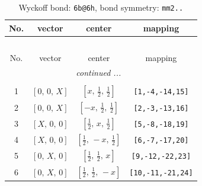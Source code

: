 \documentclass[fleqn,8pt]{jsarticle}
\begin{document}
\renewcommand{\arraystretch}{1.2}
\begin{longtable}{cccc}
\caption{Wyckoff bond: {\tt 6b@6h}, bond symmetry: {\tt mm2..}}
 \\
 \hline \hline
No. & vector & center & mapping \\ \hline \endfirsthead

\multicolumn{3}{l}{\tablename\ \thetable{}} \\
 \hline \hline
No. & vector & center & mapping \\ \hline \endhead

 \hline \hline
\multicolumn{3}{r}{\footnotesize\it continued ...} \\ \endfoot

 \hline \hline
\multicolumn{3}{r}{} \\ \endlastfoot

1 & $\left[ 0,\, 0,\, X \right]$ & $\left[ x,\, \frac{1}{2},\, \frac{1}{2} \right]$ & {\tt [1,-4,-14,15]} \\ \hline
2 & $\left[ 0,\, 0,\, X \right]$ & $\left[ - x,\, \frac{1}{2},\, \frac{1}{2} \right]$ & {\tt [2,-3,-13,16]} \\ \hline
3 & $\left[ X,\, 0,\, 0 \right]$ & $\left[ \frac{1}{2},\, x,\, \frac{1}{2} \right]$ & {\tt [5,-8,-18,19]} \\ \hline
4 & $\left[ X,\, 0,\, 0 \right]$ & $\left[ \frac{1}{2},\, - x,\, \frac{1}{2} \right]$ & {\tt [6,-7,-17,20]} \\ \hline
5 & $\left[ 0,\, X,\, 0 \right]$ & $\left[ \frac{1}{2},\, \frac{1}{2},\, x \right]$ & {\tt [9,-12,-22,23]} \\ \hline
6 & $\left[ 0,\, X,\, 0 \right]$ & $\left[ \frac{1}{2},\, \frac{1}{2},\, - x \right]$ & {\tt [10,-11,-21,24]} \\
\end{longtable}
\renewcommand{\arraystretch}{1.2}
\end{document}
